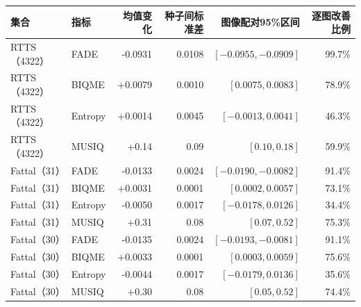 \begin{tabular*}{\textwidth}{@{\extracolsep{\fill}}llrrrr@{}}\toprule
集合 & 指标 & 均值变化 & 种子间标准差 & 图像配对95\%区间 & 逐图改善比例 \\\midrule
RTTS（4322） & FADE & -0.0931 & 0.0108 & $[-0.0955,-0.0909]$ & 99.7\% \\
RTTS（4322） & BIQME & +0.0079 & 0.0010 & $[0.0075,0.0083]$ & 78.9\% \\
RTTS（4322） & Entropy & +0.0014 & 0.0045 & $[-0.0013,0.0041]$ & 46.3\% \\
RTTS（4322） & MUSIQ & +0.14 & 0.09 & $[0.10,0.18]$ & 59.9\% \\
Fattal（31） & FADE & -0.0133 & 0.0024 & $[-0.0190,-0.0082]$ & 91.4\% \\
Fattal（31） & BIQME & +0.0031 & 0.0001 & $[0.0002,0.0057]$ & 73.1\% \\
Fattal（31） & Entropy & -0.0050 & 0.0017 & $[-0.0178,0.0126]$ & 34.4\% \\
Fattal（31） & MUSIQ & +0.31 & 0.08 & $[0.07,0.52]$ & 75.3\% \\
Fattal（30） & FADE & -0.0135 & 0.0024 & $[-0.0193,-0.0081]$ & 91.1\% \\
Fattal（30） & BIQME & +0.0033 & 0.0001 & $[0.0003,0.0059]$ & 75.6\% \\
Fattal（30） & Entropy & -0.0044 & 0.0017 & $[-0.0179,0.0136]$ & 35.6\% \\
Fattal（30） & MUSIQ & +0.30 & 0.08 & $[0.05,0.52]$ & 74.4\% \\
\bottomrule\end{tabular*}
